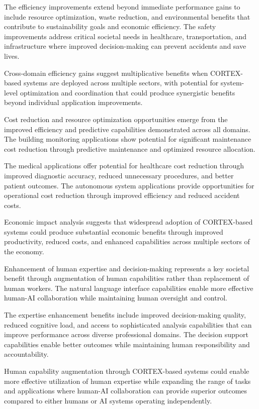 The efficiency improvements extend beyond immediate performance gains to include resource optimization, waste reduction, and environmental benefits that contribute to sustainability goals and economic efficiency. The safety improvements address critical societal needs in healthcare, transportation, and infrastructure where improved decision-making can prevent accidents and save lives.

Cross-domain efficiency gains suggest multiplicative benefits when CORTEX-based systems are deployed across multiple sectors, with potential for system-level optimization and coordination that could produce synergistic benefits beyond individual application improvements.

Cost reduction and resource optimization opportunities emerge from the improved efficiency and predictive capabilities demonstrated across all domains. The building monitoring applications show potential for significant maintenance cost reduction through predictive maintenance and optimized resource allocation.

The medical applications offer potential for healthcare cost reduction through improved diagnostic accuracy, reduced unnecessary procedures, and better patient outcomes. The autonomous system applications provide opportunities for operational cost reduction through improved efficiency and reduced accident costs.

Economic impact analysis suggests that widespread adoption of CORTEX-based systems could produce substantial economic benefits through improved productivity, reduced costs, and enhanced capabilities across multiple sectors of the economy.

Enhancement of human expertise and decision-making represents a key societal benefit through augmentation of human capabilities rather than replacement of human workers. The natural language interface capabilities enable more effective human-AI collaboration while maintaining human oversight and control.

The expertise enhancement benefits include improved decision-making quality, reduced cognitive load, and access to sophisticated analysis capabilities that can improve performance across diverse professional domains. The decision support capabilities enable better outcomes while maintaining human responsibility and accountability.

Human capability augmentation through CORTEX-based systems could enable more effective utilization of human expertise while expanding the range of tasks and applications where human-AI collaboration can provide superior outcomes compared to either humans or AI systems operating independently.


